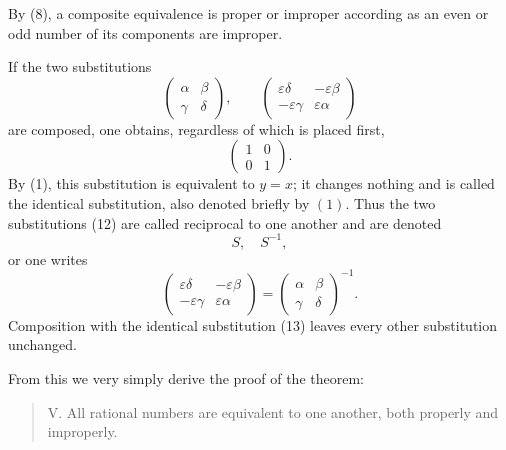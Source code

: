 \documentclass[11pt]{article}
\begin{document}
By (8), a composite equivalence is proper or improper according as an even or odd number of its components are improper.

If the two substitutions
\[
\tag{12}       \begin{pmatrix}\alpha&\beta\\ \gamma&\delta\end{pmatrix},
               \qquad
               \begin{pmatrix}\varepsilon\delta&-\varepsilon\beta\\
                              -\varepsilon\gamma&\varepsilon\alpha\end{pmatrix}
\]
are composed, one obtains, regardless of which is placed first,
\[
\tag{13}       \begin{pmatrix}1&0\\0&1\end{pmatrix}.
\]
By (1), this substitution is equivalent to $y=x$; it changes nothing and is called the identical substitution, also denoted briefly by $(1)$. Thus the two substitutions (12) are called reciprocal to one another and are denoted
\[
        S,\quad S^{-1},
\]
or one writes
\[
\tag{14}       \begin{pmatrix}\varepsilon\delta&-\varepsilon\beta\\
                              -\varepsilon\gamma&\varepsilon\alpha\end{pmatrix}
=\begin{pmatrix}\alpha&\beta\\ \gamma&\delta\end{pmatrix}^{-1}.
\]
Composition with the identical substitution (13) leaves every other substitution unchanged.

From this we very simply derive the proof of the theorem:
\begin{quote}
V. All rational numbers are equivalent to one another, both properly and improperly.
\end{quote}
\end{document}
